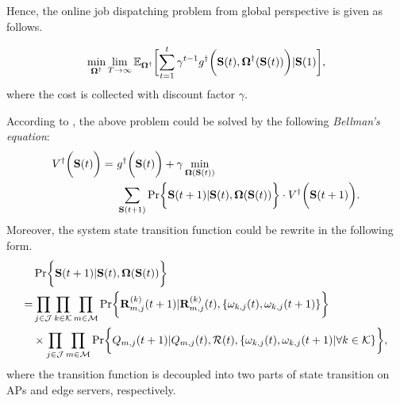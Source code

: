 Hence, the online job dispatching problem from global perspective is given as follows.
\begin{problem}
    \begin{align}
        \min_{\Policy^{\dagger}} \lim_{T \to \infty}
            \mathbb{E}_{\Policy^{\dagger}}
                \Bracket{\sum_{t=1}^t \gamma^{t-1} g^{\dagger}\Paren{\Stat(t), \Policy^{\dagger}(\Stat(t))}|\Stat(1)},
    \end{align}
    where the cost is collected with discount factor $\gamma$.
\end{problem}
According to \cite{sutton1998introduction}, the above problem could be solved by the following \emph{Bellman's equation}:
\begin{align}
    V^{\dagger}\Paren{\Stat(t)} =~&g^{\dagger}\Paren{\Stat(t)} + \gamma \min_{\Policy(\Stat(t))}
        \nonumber\\
        &\sum_{\Stat({t+1})} \Pr\Brace{ \Stat({t+1})|\Stat(t), \Policy(\Stat(t)) } \cdot V^{\dagger}\Paren{\Stat({t+1})}.
    \label{eqn:sp_0}
\end{align}
Moreover, the system state transition function could be rewrite in the following form.
\begin{align}
    & \Pr\Brace{ \Stat({t+1})|\Stat(t), \Policy(\Stat(t)) }
    \nonumber\\
    =& \prod_{j\in\jSpace}\prod_{k\in\apSet}\prod_{m\in\esSet}
            \Pr\Brace{
                \vec{R}^{(k)}_{m,j}({t+1}) | \vec{R}^{(k)}_{m,j}(t),
                \set{\omega_{k,j}(t), \omega_{k,j}(t+1)}
            }  
        \nonumber\\
        & \times \prod_{j\in\jSpace}\prod_{m\in\esSet}
            \Pr\Brace{
                Q_{m,j}({t+1})|Q_{m,j}(t), \mathcal{R}(t),
                \set{\omega_{k,j}(t), \omega_{k,j}(t+1)|\forall k\in\apSet}
            },
\end{align}
where the transition function is decoupled into two parts of state transition on APs and edge servers, respectively.

